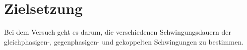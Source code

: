 \section{Zielsetzung}

\begin{flushleft}
    Bei dem Versuch geht es darum, die verschiedenen Schwingungsdauern der gleichphasigen-, gegenphasigen- und gekoppelten Schwingungen zu bestimmen.
\end{flushleft}